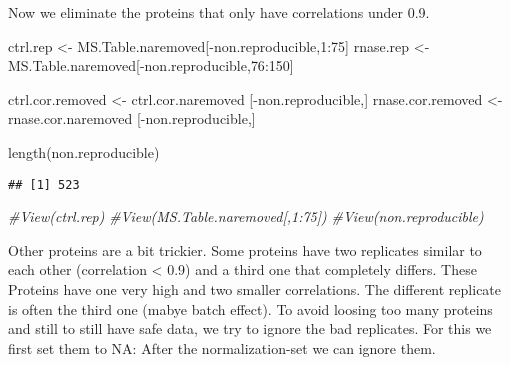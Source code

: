 \documentclass[
]{article}
\newenvironment{Shaded}{\begin{snugshade}}{\end{snugshade}}
\newcommand{\CommentTok}[1]{\textcolor[rgb]{0.56,0.35,0.01}{\textit{#1}}}
\newcommand{\DecValTok}[1]{\textcolor[rgb]{0.00,0.00,0.81}{#1}}
\newcommand{\FunctionTok}[1]{\textcolor[rgb]{0.00,0.00,0.00}{#1}}
\newcommand{\NormalTok}[1]{#1}
\newcommand{\OtherTok}[1]{\textcolor[rgb]{0.56,0.35,0.01}{#1}}
\newcommand{\SpecialCharTok}[1]{\textcolor[rgb]{0.00,0.00,0.00}{#1}}
\begin{document}
Now we eliminate the proteins that only have correlations under 0.9.

\begin{Shaded}
\begin{Highlighting}[]
\NormalTok{ctrl.rep }\OtherTok{\textless{}{-}}\NormalTok{ MS.Table.naremoved[}\SpecialCharTok{{-}}\NormalTok{non.reproducible,}\DecValTok{1}\SpecialCharTok{:}\DecValTok{75}\NormalTok{]}
\NormalTok{rnase.rep }\OtherTok{\textless{}{-}}\NormalTok{ MS.Table.naremoved[}\SpecialCharTok{{-}}\NormalTok{non.reproducible,}\DecValTok{76}\SpecialCharTok{:}\DecValTok{150}\NormalTok{]}

\NormalTok{ctrl.cor.removed }\OtherTok{\textless{}{-}}\NormalTok{ ctrl.cor.naremoved [}\SpecialCharTok{{-}}\NormalTok{non.reproducible,]}
\NormalTok{rnase.cor.removed }\OtherTok{\textless{}{-}}\NormalTok{ rnase.cor.naremoved [}\SpecialCharTok{{-}}\NormalTok{non.reproducible,]}


\FunctionTok{length}\NormalTok{(non.reproducible)}
\end{Highlighting}
\end{Shaded}

\begin{verbatim}
## [1] 523
\end{verbatim}

\begin{Shaded}
\begin{Highlighting}[]
\CommentTok{\#View(ctrl.rep)}
\CommentTok{\#View(MS.Table.naremoved[,1:75])}
\CommentTok{\#View(non.reproducible)}
\end{Highlighting}
\end{Shaded}

Other proteins are a bit trickier. Some proteins have two replicates
similar to each other (correlation \textless{} 0.9) and a third one that
completely differs. These Proteins have one very high and two smaller
correlations. The different replicate is often the third one (mabye
batch effect). To avoid loosing too many proteins and still to still
have safe data, we try to ignore the bad replicates. For this we first
set them to NA: After the normalization-set we can ignore them.
\end{document}
